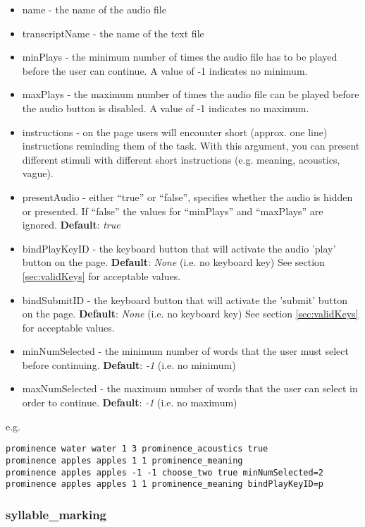 \begin{itemize}
\item name - the name of the audio file
\item transcriptName - the name of the text file
\item minPlays - the minimum number of times the audio file has to be played before the user can continue. A value of -1 indicates no minimum.
\item maxPlays - the maximum number of times the audio file can be played before the audio button is disabled. A value of -1 indicates no maximum.
\item instructions - on the page users will encounter short (approx. one line) instructions reminding them of the task.  With this argument, you can present different stimuli with different short instructions (e.g. meaning, acoustics, vague). 
\item presentAudio - either ``true'' or ``false'', specifies whether the audio is hidden or presented.  If ``false'' the values for ``minPlays'' and ``maxPlays'' are ignored. \textbf{Default}: \textit{true}
\item bindPlayKeyID - the keyboard button that will activate the audio 'play' button on the page.  \textbf{Default}: \textit{None} (i.e. no keyboard key)  See section \ref{sec:validKeys} for acceptable values.
\item bindSubmitID - the keyboard button that will activate the 'submit' button on the page.  \textbf{Default}: \textit{None} (i.e. no keyboard key)  See section \ref{sec:validKeys} for acceptable values.
\item minNumSelected - the minimum number of words that the user must select before continuing.  \textbf{Default}: \textit{-1} (i.e. no minimum)
\item maxNumSelected - the maximum number of words that the user can select in order to continue.  \textbf{Default}: \textit{-1} (i.e. no maximum)
\end{itemize}
e.g.

\begin{lstlisting}
prominence water water 1 3 prominence_acoustics true
prominence apples apples 1 1 prominence_meaning
prominence apples apples -1 -1 choose_two true minNumSelected=2
prominence apples apples 1 1 prominence_meaning bindPlayKeyID=p 
\end{lstlisting}


\subsubsection{syllable\_marking}

